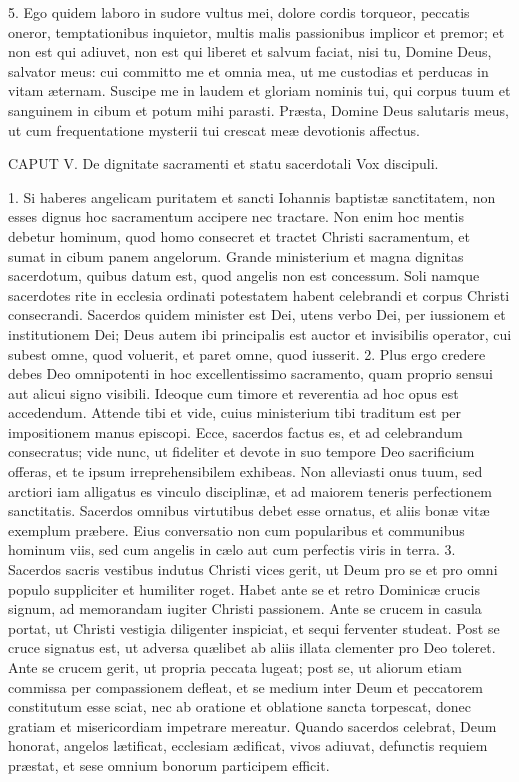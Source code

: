 \documentclass[twoside]{article}
\begin{document}
5. Ego quidem laboro in sudore vultus mei, dolore cordis torqueor, peccatis oneror, temptationibus inquietor, multis malis passionibus implicor et premor; et non est qui adiuvet, non est qui liberet et salvum faciat, nisi tu, Domine Deus, salvator meus: cui committo me et omnia mea, ut me custodias et perducas in vitam æternam. Suscipe me in laudem et gloriam nominis tui, qui corpus tuum et sanguinem in cibum et potum mihi parasti. Præsta, Domine Deus salutaris meus, ut cum frequentatione mysterii tui crescat meæ devotionis affectus.


CAPUT V.
De dignitate sacramenti et statu sacerdotali
Vox discipuli.

1. Si haberes angelicam puritatem et sancti Iohannis baptistæ sanctitatem, non esses dignus hoc sacramentum accipere nec tractare. Non enim hoc mentis debetur hominum, quod homo consecret et tractet Christi sacramentum, et sumat in cibum panem angelorum. Grande ministerium et magna dignitas sacerdotum, quibus datum est, quod angelis non est concessum. Soli namque sacerdotes rite in ecclesia ordinati potestatem habent celebrandi et corpus Christi consecrandi. Sacerdos quidem minister est Dei, utens verbo Dei, per iussionem et institutionem Dei; Deus autem ibi principalis est auctor et invisibilis operator, cui subest omne, quod voluerit, et paret omne, quod iusserit.
2. Plus ergo credere debes Deo omnipotenti in hoc excellentissimo sacramento, quam proprio sensui aut alicui signo visibili. Ideoque cum timore et reverentia ad hoc opus est accedendum. Attende tibi et vide, cuius ministerium tibi traditum est per impositionem manus episcopi. Ecce, sacerdos factus es, et ad celebrandum consecratus; vide nunc, ut fideliter et devote in suo tempore Deo sacrificium offeras, et te ipsum irreprehensibilem exhibeas. Non alleviasti onus tuum, sed arctiori iam alligatus es vinculo disciplinæ, et ad maiorem teneris perfectionem sanctitatis. Sacerdos omnibus virtutibus debet esse ornatus, et aliis bonæ vitæ exemplum præbere. Eius conversatio non cum popularibus et communibus hominum viis, sed cum angelis in cælo aut cum perfectis viris in terra.
3. Sacerdos sacris vestibus indutus Christi vices gerit, ut Deum pro se et pro omni populo suppliciter et humiliter roget. Habet ante se et retro Dominicæ crucis signum, ad memorandam iugiter Christi passionem. Ante se crucem in casula portat, ut Christi vestigia diligenter inspiciat, et sequi ferventer studeat. Post se cruce signatus est, ut adversa quælibet ab aliis illata clementer pro Deo toleret. Ante se crucem gerit, ut propria peccata lugeat; post se, ut aliorum etiam commissa per compassionem defleat, et se medium inter Deum et peccatorem constitutum esse sciat, nec ab oratione et oblatione sancta torpescat, donec gratiam et misericordiam impetrare mereatur. Quando sacerdos celebrat, Deum honorat, angelos lætificat, ecclesiam ædificat, vivos adiuvat, defunctis requiem præstat, et sese omnium bonorum participem efficit.
\end{document}
